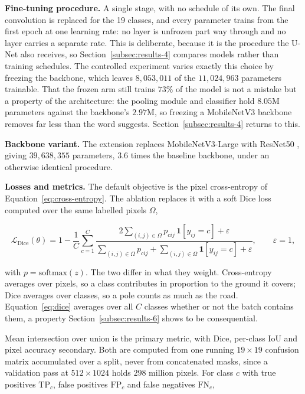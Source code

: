 \textbf{Fine-tuning procedure.} A single stage, with no schedule of its own. The final
convolution is replaced for the 19 classes, and every parameter trains from the first epoch at
one learning rate: no layer is unfrozen part way through and no layer carries a separate rate.
This is deliberate, because it is the procedure the U-Net also receives, so
Section~\ref{subsec:results-4} compares models rather than training schedules. The controlled
experiment varies exactly this choice by freezing the backbone, which leaves $8{,}053{,}011$ of the $11{,}024{,}963$ parameters trainable. That the
frozen arm still trains $73\%$ of the model is not a mistake but a property of the architecture:
the pooling module and classifier hold $8.05$M parameters against the backbone's $2.97$M, so
freezing a MobileNetV3 backbone removes far less than the word suggests.
Section~\ref{subsec:results-4} returns to this.

\textbf{Backbone variant.} The extension replaces MobileNetV3-Large with ResNet50
\cite{he2016resnet}, giving $39{,}638{,}355$ parameters, $3.6$ times the baseline backbone, under
an otherwise identical procedure.

\textbf{Losses and metrics.} The default objective is the pixel cross-entropy of
Equation~\ref{eq:cross-entropy}. The ablation replaces it with a soft Dice loss
\cite{milletari2016vnet} computed over the same labelled pixels $\Omega$,

\begin{equation}
    \mathcal{L}_{\mathrm{Dice}}(\theta) = 1 - \frac{1}{C} \sum_{c=1}^{C}
    \frac{2 \sum_{(i,j) \in \Omega} p_{cij}\, \mathbf{1}[y_{ij} = c] + \varepsilon}
         {\sum_{(i,j) \in \Omega} p_{cij} + \sum_{(i,j) \in \Omega} \mathbf{1}[y_{ij} = c] + \varepsilon},
    \qquad \varepsilon = 1,
    \label{eq:dice}
\end{equation}

with $p = \mathrm{softmax}(z)$. The two differ in what they weight. Cross-entropy averages over
pixels, so a class contributes in proportion to the ground it covers; Dice averages over classes,
so a pole counts as much as the road. Equation~\ref{eq:dice} averages over all $C$ classes
whether or not the batch contains them, a property Section~\ref{subsec:results-6} shows to be
consequential.

Mean intersection over union is the primary metric, with Dice, per-class IoU and pixel accuracy
secondary. Both are computed from one running $19 \times 19$ confusion matrix accumulated over a
split, never from concatenated masks, since a validation pass at $512 \times 1024$ holds
$298$ million pixels. For class $c$ with true positives $\mathrm{TP}_c$, false positives
$\mathrm{FP}_c$ and false negatives $\mathrm{FN}_c$,

